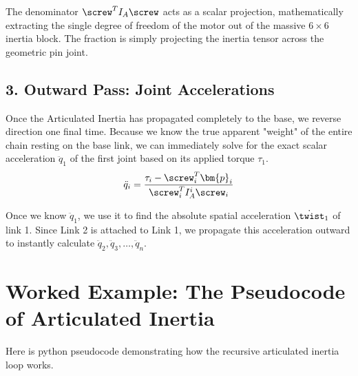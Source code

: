 The denominator $\screw^T I_A \screw$ acts as a scalar projection, mathematically extracting the single degree of freedom of the motor out of the massive $6 \times 6$ inertia block. The fraction is simply projecting the inertia tensor across the geometric pin joint.

\subsection{3. Outward Pass: Joint Accelerations}
Once the Articulated Inertia has propagated completely to the base, we reverse direction one final time.
Because we know the true apparent "weight" of the entire chain resting on the base link, we can immediately solve for the exact scalar acceleration $\ddot{q}_1$ of the first joint based on its applied torque $\tau_1$.
\begin{equation}
   \ddot{q}_i = \frac{\tau_i - \screw_i^T \bm{p}_i}{\screw_i^T I_A^i \screw_i}
\end{equation}

Once we know $\ddot{q}_1$, we use it to find the absolute spatial acceleration $\dot{\twist}_1$ of link 1. Since Link 2 is attached to Link 1, we propagate this acceleration outward to instantly calculate $\ddot{q}_2, \ddot{q}_3, \dots, \ddot{q}_n$. 

\section{Worked Example: The Pseudocode of Articulated Inertia}

Here is python pseudocode demonstrating how the recursive articulated inertia loop works.

